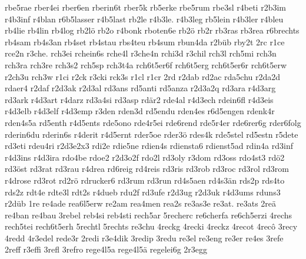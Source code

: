 {    rbe5rae
    rber4ei
    rber6en
    rberin6t
    rber5k
    rb5erke
    rbe5rum
    rbe3sl
    r4beti
    r2b3im
    r4b3inf
    r4blan
    r6b5lasser
    r4b5last
    rb2le
    r4b3le.
    r4b3leg
    rb5lein
    r4b3ler
    r4bleu
    rb4lie
    rb4lin
    rb4log
    rb2lö
    rb2o
    r4bonk
    rboten6e
    rb2ö
    rb2r
    rb3ras
    rb3rea
    r6brechts
    rb4sam
    rb4s3an
    rb4set
    rb4stau
    rbs4teu
    rb4sum
    rbun4da
    r2büb
    rby2t
    2rc
    r1ce
    rce2n
    r3che.
    rch3ei
    rchein6s
    rche4l
    r3che4n
    rchi3d
    r3chil
    rch3l
    rch5mi
    rch3n
    rch3ra
    rch3re
    rch3s2
    rch5sp
    rch3t4a
    rch6t5er6f
    rch6t5erg
    rch6t5er6r
    rch6t5erw
    r2ch3u
    rch3w
    r1ci
    r2ck
    r3cki
    rck3s
    r1cl
    r1cr
    2rd
    r2dab
    rd2ac
    rda5chu
    r2da2d
    rdaer4
    r2daf
    r2d3ak
    r2d3al
    rd3ans
    rd5anti
    rd5anza
    r2d3a2q
    rd3ara
    r4d3arg
    rd3ark
    r4d3art
    r4darz
    rd3a4si
    rd3asp
    rdär2
    rde4al
    r4d3ech
    rdein6fl
    r4d3eis
    r4d3elb
    r4d3elf
    r4d3emp
    r3den
    rden3d
    rd5endu
    rden4es
    r6d5engen
    rdenk4r
    rden4s5a
    rd5enth
    r4d5ents
    rde5ono
    rde4r5ei
    rde6rend
    rde5r4er
    rde6rer6g
    rder6folg
    rderin6du
    rderin6s
    r4derit
    r4d5ernt
    rder5oe
    rder3ö
    rdes4k
    rde5stel
    rd5estn
    r5dete
    rd3eti
    rdeu4ri
    r2d3e2x3
    rdi2e
    rdie5ne
    rdien4s
    rdiensta6
    rdienst5ad
    rdin4a
    rd3inf
    r4d3ins
    r4d3ira
    rdo4be
    rdoe2
    r2d3o2f
    rdo2l
    rd3oly
    r3dom
    rd3oss
    rdo4st3
    rdö2
    rd3öst
    rd3rat
    rd3rau
    r4drea
    rd6reig
    rd4reis
    rd3ris
    rd3rob
    rd3roc
    rd3rol
    rd3rom
    r4drose
    rd3rot
    rd2rö
    rdrucker6
    rd3rum
    rd3run
    rd4s5aen
    rd4s3än
    rds2p
    rds4to
    rds2z
    rdt4e
    rdte3l
    rdt2s
    r4dueb
    rdu2f
    rd3ufe
    r2d3ug
    r2d3uk
    r4d3ums
    rduns3
    r2düb
    1re
    re4ade
    rea6l5erw
    re2am
    rea4men
    rea2s
    re3as3e
    re3at.
    re3ats
    2reä
    re4ban
    re4bau
    3rebel
    reb4si
    reb4sti
    rech5ar
    5recherc
    re6cherfa
    re6ch5erzi
    4rechs
    rech5tei
    rech6t5erh
    5rechtl
    5rechts
    re3chu
    4reckg
    4recki
    4reckz
    4recot
    4recô
    3recy
    4redd
    4r3edel
    rede3r
    2redi
    r3e4dik
    3redip
    3redu
    re3el
    re3eng
    re3er
    re4es
    3refe
    2reff
    r3effi
    3refl
    3refro
    rege4l5a
    rege4l5ä
    regelei6g
    2r3egg
}

